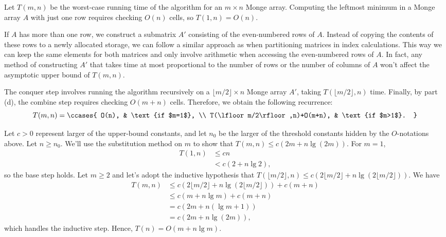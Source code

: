 Let $T(m,n)$ be the worst-case running time of the algorithm for an $m\times n$ Monge array.
Computing the leftmost minimum in a Monge array $A$ with just one row requires checking $O(n)$ cells, so $T(1,n)=O(n)$.

If $A$ has more than one row, we construct a submatrix $A'$ consisting of the even-numbered rows of $A$.
Instead of copying the contents of these rows to a newly allocated storage, we can follow a similar approach as when partitioning matrices in \dash index calculations.
This way we can keep the same elements for both matrices and only involve arithmetic when accessing the even-numbered rows of $A$.
In fact, any method of constructing $A'$ that takes time at most proportional to the number of rows or the number of columns of $A$ won't affect the asymptotic upper bound of $T(m,n)$.

The conquer step involves running the algorithm recursively on a $\lfloor m/2\rfloor\times n$ Monge array $A'$, taking $T(\lfloor m/2\rfloor,n)$ time.
Finally, by part (d), the combine step requires checking $O(m+n)$ cells.
Therefore, we obtain the following recurrence:
\[
    T(m,n) =
    \ccases{
        O(n), & \text{if $m=1$}, \\
        T(\lfloor m/2\rfloor,n)+O(m+n), & \text{if $m>1$}.
    }
\]

Let $c>0$ represent larger of the upper-bound constants, and let $n_0$ be the larger of the threshold constants hidden by the $O$-notations above.
Let $n\ge n_0$.
We'll use the substitution method on $m$ to show that $T(m,n)\le c(2m+n\lg(2m))$.
For $m=1$,
\begin{align*}
    T(1,n) &\le cn \\
    &< c(2+n\lg2),
\end{align*}
so the base step holds.
Let $m\ge2$ and let's adopt the inductive hypothesis that $T(\lfloor m/2\rfloor,n)\le c(2\lfloor m/2\rfloor+n\lg(2\lfloor m/2\rfloor))$.
We have
\begin{align*}
    T(m,n) &\le c(2\lfloor m/2\rfloor+n\lg(2\lfloor m/2\rfloor))+c(m+n) \\
    &\le c(m+n\lg m)+c(m+n) \\
    &= c(2m+n(\lg m+1)) \\
    &= c(2m+n\lg(2m)),
\end{align*}
which handles the inductive step.
Hence, $T(n)=O(m+n\lg m)$.
